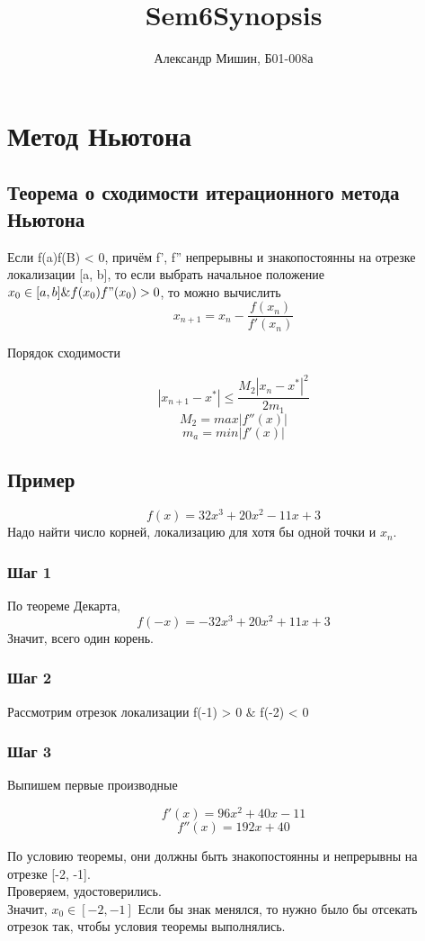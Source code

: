 \documentclass[a4paper,12pt]{article}
\title{Sem6Synopsis}
\author{Александр Мишин, Б01-008а}
\date{}
\newcommand\attention[1]{\colorbox{cyan!30}{#1}}
\begin{document}
\maketitle

\section{Метод Ньютона}

\subsection*{\attention{Теорема о сходимости итерационного метода Ньютона}}
Если f(a)f(B) < 0, причём f', f'' непрерывны и знакопостоянны на отрезке локализации [a, b], то если выбрать начальное положение $x_0 \in [a, b] \& f(x_0)f"(x_0) > 0$, то можно вычислить
\[x_{n+1} = x_n - \frac{f(x_n)}{f'(x_n)}\]

Порядок сходимости

\[|x_{n+1} - x^*| \leq \frac{M_2 |x_n - x^*| ^ 2}{2m_1}\]
\[M_2 = max|f''(x)|\]
\[m_a = min|f'(x)|\]

\subsection{Пример}

    \[f(x) = 32x^3 + 20x^2 -11x + 3\]
    Надо найти число корней, локализацию для хотя бы одной точки и $x_n$.
\subsubsection{Шаг 1}
    По теореме Декарта, 
    \[f(-x) = -32x^3 + 20x^2 + 11x + 3\]
    Значит, всего один корень.
\subsubsection{Шаг 2}
    Рассмотрим отрезок локализации f(-1) > 0 $\&$ f(-2) < 0
\subsubsection{Шаг 3}
    Выпишем первые производные
    
    \[f'(x) = 96x^2 + 40x -11\]
    \[f''(x) = 192x + 40\]
    
    По условию теоремы, они должны быть знакопостоянны и непрерывны на отрезке [-2, -1].\\
    Проверяем, удостоверились.\\
    Значит, $x_0 \in [-2, -1]$
    Если бы знак менялся, то нужно было бы отсекать отрезок так, чтобы условия теоремы выполнялись.
\end{document}
